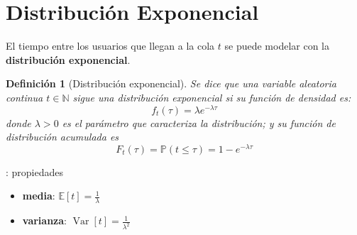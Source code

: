 \documentclass{beamer}
\DeclareMathOperator{\Var}{Var}
\newtheorem{definicion}{Definición}[section]
\newcommand{\blue}[1]{{\color{blue}#1}}
\begin{document}
\section{Distribución Exponencial}

\begin{frame}{\secname}
    \begin{figure}
        
    \end{figure}
    El tiempo entre los usuarios que
    llegan a la cola \blue{$t$} se puede
    modelar con la \textbf{distribución exponencial}.
\end{frame}



\begin{frame}{\secname}
    \begin{definicion}[Distribución exponencial]
        Se dice que una variable aleatoria
        continua $t\in\mathbb{N}$ sigue una
        distribución exponencial si su
        función de densidad es:
        \begin{equation}
            f_t(\tau) = \lambda e^{-\lambda \tau}
        \end{equation}
        donde $\lambda>0$ es el parámetro
        que caracteriza la distribución;
        y su función de distribución
        acumulada es
        \begin{equation}
            F_t(\tau) = \mathbb{P}(t\leq\tau) = 1- e^{-\lambda \tau}
        \end{equation}
    \end{definicion}
\end{frame}




\begin{frame}{\secname: propiedades}
    \begin{figure}
        
    \end{figure}


    \begin{itemize}
        \item \textbf{media}: $\mathbb{E}[t]=\tfrac{1}{\lambda}$
        \item \textbf{varianza}: $\Var[t]=\tfrac{1}{\lambda^2}$
    \end{itemize}
\end{frame}
\end{document}
